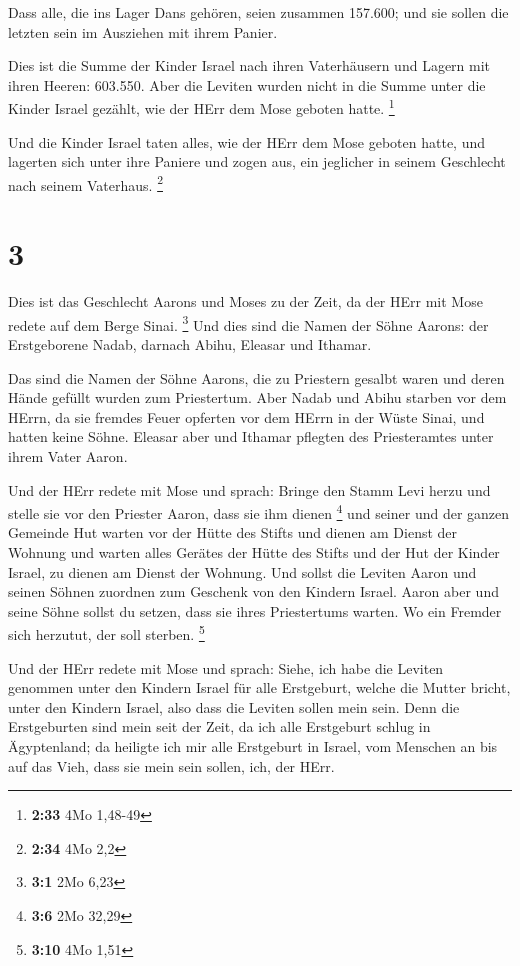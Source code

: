  Dass alle, die ins Lager Dans gehören, seien zusammen
157.600; und sie sollen die letzten sein im Ausziehen mit ihrem Panier.

 Dies ist die Summe der Kinder Israel nach ihren
Vaterhäusern und Lagern mit ihren Heeren: 603.550.  Aber
die Leviten wurden nicht in die Summe unter die Kinder Israel gezählt,
wie der HErr dem Mose geboten hatte. \footnote{\textbf{2:33} 4Mo 1,48-49}

 Und die Kinder Israel taten alles, wie der HErr dem Mose
geboten hatte, und lagerten sich unter ihre Paniere und zogen aus, ein
jeglicher in seinem Geschlecht nach seinem Vaterhaus. \footnote{\textbf{2:34}
  4Mo 2,2}

\hypertarget{section-1}{%
\section{3}\label{section-1}}

 Dies ist das Geschlecht Aarons und Moses zu der Zeit, da
der HErr mit Mose redete auf dem Berge Sinai. \footnote{\textbf{3:1} 2Mo
  6,23}  Und dies sind die Namen der Söhne Aarons: der
Erstgeborene Nadab, darnach Abihu, Eleasar und Ithamar.

 Das sind die Namen der Söhne Aarons, die zu Priestern
gesalbt waren und deren Hände gefüllt wurden zum Priestertum.
 Aber Nadab und Abihu starben vor dem HErrn, da sie fremdes
Feuer opferten vor dem HErrn in der Wüste Sinai, und hatten keine Söhne.
Eleasar aber und Ithamar pflegten des Priesteramtes unter ihrem Vater
Aaron.

 Und der HErr redete mit Mose und sprach: 
Bringe den Stamm Levi herzu und stelle sie vor den Priester Aaron, dass
sie ihm dienen \footnote{\textbf{3:6} 2Mo 32,29}  und seiner
und der ganzen Gemeinde Hut warten vor der Hütte des Stifts und dienen
am Dienst der Wohnung  und warten alles Gerätes der Hütte
des Stifts und der Hut der Kinder Israel, zu dienen am Dienst der
Wohnung.  Und sollst die Leviten Aaron und seinen Söhnen
zuordnen zum Geschenk von den Kindern Israel.  Aaron aber
und seine Söhne sollst du setzen, dass sie ihres Priestertums warten. Wo
ein Fremder sich herzutut, der soll sterben. \footnote{\textbf{3:10} 4Mo
  1,51}

 Und der HErr redete mit Mose und sprach: 
Siehe, ich habe die Leviten genommen unter den Kindern Israel für alle
Erstgeburt, welche die Mutter bricht, unter den Kindern Israel, also
dass die Leviten sollen mein sein.  Denn die Erstgeburten
sind mein seit der Zeit, da ich alle Erstgeburt schlug in Ägyptenland;
da heiligte ich mir alle Erstgeburt in Israel, vom Menschen an bis auf
das Vieh, dass sie mein sein sollen, ich, der HErr.

